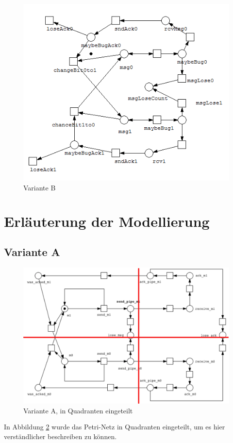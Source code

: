 \documentclass[]{scrartcl}
\begin{document}
\begin{figure}[H]
	\centering
	\includegraphics[width=1\linewidth]{altBitPro.png}
	\caption{Variante B}
	\label{fig:petri_net_B}
\end{figure}

\section{Erläuterung der Modellierung}
\subsection{Variante A}
\begin{figure}[H]
	\centering
	\includegraphics[width=1\linewidth]{petrinet_grid.png}
	\caption{Variante A, in Quadranten eingeteilt}
	\label{fig:petri_net_A_withgrid}
\end{figure}
In Abbildung \ref{fig:petri_net_A_withgrid} wurde das Petri-Netz in Quadranten eingeteilt, um es hier verständlicher beschreiben zu können.
\end{document}
